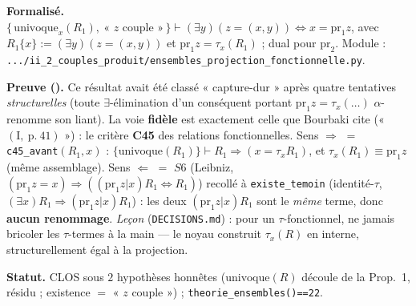 \textbf{Formalisé.} $\{\,\mathrm{univoque}_x(R_1),\ \text{« $z$ couple »}\,\}\vdash
(\exists y)(z=(x,y))\Leftrightarrow x=\mathrm{pr}_1 z$, avec $R_1\{x\}:=(\exists y)(z=(x,y))$ et
$\mathrm{pr}_1 z=\tau_x(R_1)$ ; dual pour $\mathrm{pr}_2$. Module :
\texttt{.../ii\_2\_couples\_produit/ensembles\_projection\_fonctionnelle.py}.

\textbf{Preuve (\Nstar).} Ce résultat avait été classé « capture-dur » après quatre tentatives
\emph{structurelles} (toute $\exists$-élimination d'un conséquent portant $\mathrm{pr}_1 z=\tau_x(\dots)$
$\alpha$-renomme son liant). La voie \textbf{fidèle} est exactement celle que Bourbaki cite
(« $(\mathrm{I},\ \mathrm{p.}\ 41)$ ») : le critère \textbf{C45} des relations fonctionnelles.
Sens $\Rightarrow$ $=$ \texttt{c45\_avant}$(R_1,x)$ : $\{\mathrm{univoque}(R_1)\}\vdash R_1\Rightarrow(x=\tau_x R_1)$,
et $\tau_x(R_1)\equiv\mathrm{pr}_1 z$ (même assemblage). Sens $\Leftarrow$ $=$ $S6$ (Leibniz,
$(\mathrm{pr}_1 z{=}x)\Rightarrow((\mathrm{pr}_1 z|x)R_1\Leftrightarrow R_1)$) recollé à
\texttt{existe\_temoin} (identité-$\tau$, $(\exists x)R_1\Rightarrow(\mathrm{pr}_1 z|x)R_1$) : les deux
$(\mathrm{pr}_1 z|x)R_1$ sont le \emph{même} terme, donc \textbf{aucun renommage}. \emph{Leçon}
(\texttt{DECISIONS.md}) : pour un $\tau$-fonctionnel, ne jamais bricoler les $\tau$-termes à la main ---
le noyau construit $\tau_x(R)$ en interne, structurellement égal à la projection.

\textbf{Statut.} CLOS sous $2$ hypothèses honnêtes ($\mathrm{univoque}(R)$ découle de la Prop.~1, résidu ;
existence $=$ « $z$ couple ») ; \texttt{theorie\_ensembles()==22}.
